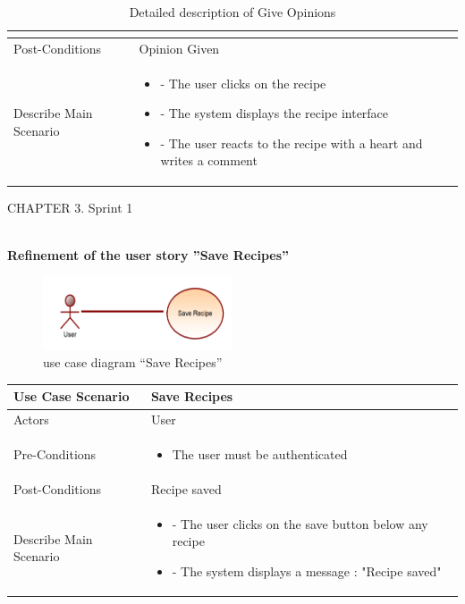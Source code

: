\documentclass{article}
\begin{document}
{{{{{\begin{table}[h]
\begin{tabularx}{\textwidth}{X|X}
\begin{itemize}[label=$\bullet$]
        \end{itemize} \\
        \midrule
        Post-Conditions & Opinion Given  \\
        \midrule
        Describe Main Scenario &  \begin{itemize}[label=$\bullet$]
            \item - The user clicks on the recipe
            \item- The system displays the recipe interface
	\item- The user reacts to the recipe with a heart and writes a comment
           
        \end{itemize} \\
        \bottomrule
    \end{tabularx}
    \caption{Detailed description of Give Opinions}
    \label{tab:actors_roles}
\end{table}
\newpage
\noindent
CHAPTER 3.  Sprint 1 \\
\underline{\hspace{\textwidth}} \vspace{0.2cm}\\
{\large \textbf{Refinement of the user story ”Save Recipes”}
\begin{figure}[htbp]
    \centering
    \includegraphics[width=0.5\textwidth]{save}
    \caption{use case diagram “Save Recipes”}
    \label{fig:design2}
\end{figure}
\begin{table}[h]
    \centering
    \begin{tabularx}{\textwidth}{X|X}
        \toprule
        Use Case Scenario & Save Recipes\\
        \midrule
        Actors & User \\
        \midrule
        Pre-Conditions & \begin{itemize}[label=$\bullet$]
            \item The user must be authenticated
           
        \end{itemize} \\
        \midrule
        Post-Conditions & Recipe saved  \\
        \midrule
        Describe Main Scenario &  \begin{itemize}[label=$\bullet$]
            \item - The user clicks on the save button below any recipe
            \item- The system displays a message : "Recipe saved"
	

\end{itemize}
\end{tabularx}
\end{table}}}}}}}
\end{document}

